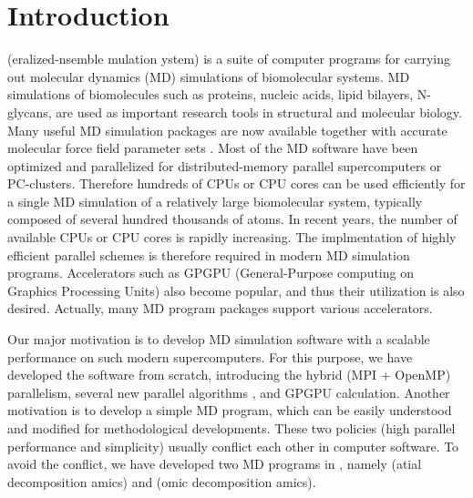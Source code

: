 \documentclass[a4paper,11pt,oneside,english]{sphinxmanual}
\begin{document}
\chapter{Introduction}
\label{\detokenize{00_Introduction:introduction}}\label{\detokenize{00_Introduction:id1}}\label{\detokenize{00_Introduction::doc}}
 (eralized-nsemble mulation ystem)
is a suite of
computer programs for carrying out molecular dynamics (MD) simulations
of biomolecular systems. MD simulations of biomolecules such as proteins,
nucleic acids, lipid bilayers, N-glycans, are used as
important research tools in structural and molecular biology. Many
useful MD simulation packages 
  
 are now available together with accurate
molecular force field parameter sets 
  
. Most of the MD software have been optimized
and parallelized for distributed-memory parallel supercomputers or
PC-clusters. Therefore hundreds of CPUs or CPU cores can be used
efficiently for a single MD simulation of a relatively large
biomolecular system, typically composed of several hundred
thousands of atoms. In recent years, the number of available CPUs
or CPU cores is rapidly increasing. The implmentation of highly
efficient parallel schemes is therefore required in modern MD simulation
programs. Accelerators such as GPGPU (General-Purpose
computing on Graphics Processing Units) also become popular,
and thus their utilization is also desired.
Actually, many MD program packages support various accelerators.

Our major motivation is to develop MD simulation software
with a scalable performance on such modern supercomputers. For this
purpose, we have developed the software from scratch, introducing the
hybrid (MPI + OpenMP) parallelism, several new parallel
algorithms  , and GPGPU calculation.
Another motivation is to develop a simple MD program, which can be
easily understood and modified for methodological developments. These two
policies (high parallel performance and simplicity) usually conflict
each other in computer software.
To avoid the conflict, we have developed two MD programs in ,
namely  (atial decomposition amics)
and  (omic decomposition amics).
\end{document}
